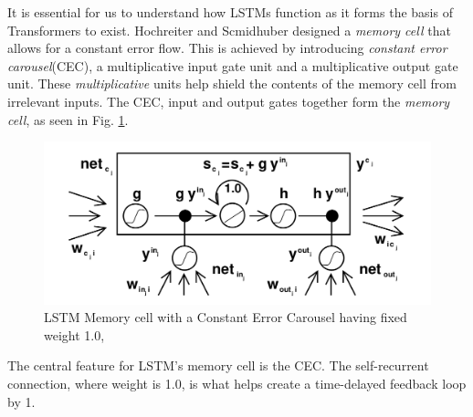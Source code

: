 \documentclass[12pt]{report}
\begin{document}
            It is essential for us to understand how LSTMs function as it forms the basis of Transformers to exist. Hochreiter and Scmidhuber designed a \textit{memory cell} that  allows for a constant error flow. This is achieved by introducing \textit{constant error carousel}(CEC), a multiplicative input gate unit and a multiplicative output gate unit. These \textit{multiplicative} units help shield the contents of the memory cell from irrelevant inputs. The CEC, input and output gates together form the \textit{memory cell}, as seen in Fig. \ref{lstmCEC}.
           	\begin{figure}[h!]
      				\includegraphics[scale=0.35]{../images/lstm-memorycell.png}
      				\caption{LSTM Memory cell with a Constant Error Carousel having fixed weight 1.0, \citep{lstmoriginal}}\label{lstmCEC}
             \end{figure}
            The central feature for LSTM's memory cell is the CEC. The self-recurrent connection, where weight is 1.0, is what helps create a time-delayed feedback loop by 1.
\end{document}
